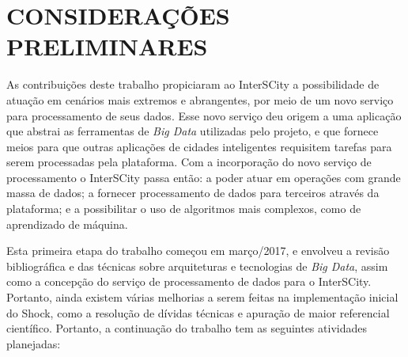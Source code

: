 \chapter{CONSIDERAÇÕES PRELIMINARES}
\label{chapter:final}

As contribuições deste trabalho propiciaram ao InterSCity a possibilidade de
atuação em cenários mais extremos e abrangentes, por meio de um novo serviço
para processamento de seus dados. Esse novo serviço deu origem a uma aplicação
que abstrai as ferramentas de \textit{Big Data} utilizadas pelo projeto, e que fornece
meios para que outras aplicações de cidades inteligentes requisitem tarefas para
serem processadas pela plataforma. Com a incorporação do novo serviço de
processamento o InterSCity passa então: a poder atuar em operações com grande
massa de dados; a fornecer processamento de dados para terceiros através da
plataforma; e a possibilitar o uso de algoritmos mais complexos, como de
aprendizado de máquina.

Esta primeira etapa do trabalho começou em março/2017, e envolveu a revisão
bibliográfica e das técnicas sobre arquiteturas e tecnologias de \textit{Big Data}, assim
como a concepção do serviço de processamento de dados para o InterSCity.
Portanto, ainda existem várias melhorias a serem feitas na implementação
inicial do Shock, como a resolução de dívidas técnicas e apuração de maior
referencial científico. Portanto, a continuação do trabalho tem as seguintes
atividades planejadas:

